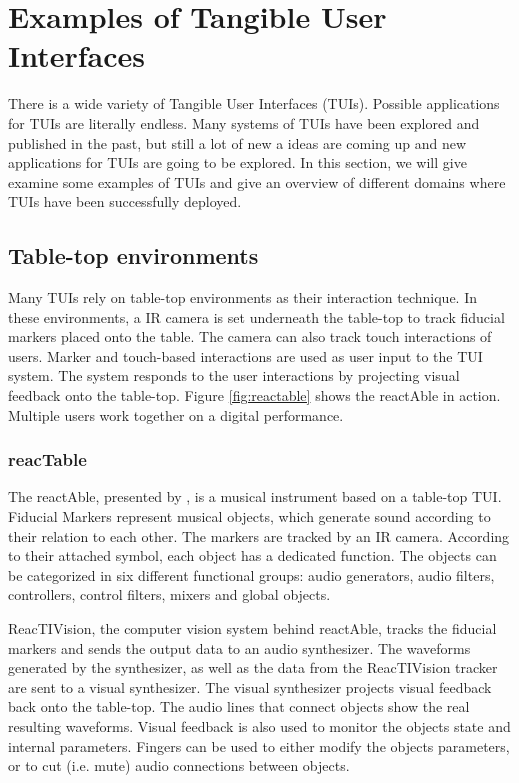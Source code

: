 \section{Examples of Tangible User Interfaces}
There is a wide variety of Tangible User Interfaces (TUIs). Possible applications for TUIs are literally endless. Many systems of TUIs have been explored and published in the past, but still a lot of new a ideas are coming up and new applications for TUIs are going to be explored. In this section, we will give examine some examples of TUIs and give an overview of different domains where TUIs have been successfully deployed.

\subsection{Table-top environments}
Many TUIs rely on table-top environments as their interaction technique. In these environments, a IR camera is set underneath the table-top to track fiducial markers placed onto the table. The camera can also track touch interactions of users. Marker and touch-based interactions are used as user input to the TUI system. The system responds to the user interactions by projecting visual feedback onto the table-top. Figure \ref{fig:reactable} shows the reactAble in action. Multiple users work together on a digital performance.

\subsubsection{reacTable}
The reactAble, presented by \cite{jorda07}, is a musical instrument based on a table-top TUI. Fiducial Markers represent musical objects, which generate sound according to their relation to each other. The markers are tracked by an IR camera. According to their attached symbol, each object has a dedicated function. The objects can be categorized in six different functional groups: audio generators, audio filters, controllers, control filters, mixers and global objects. 

ReacTIVision, the computer vision system behind reactAble, tracks the fiducial markers and sends the output data to an audio synthesizer. The waveforms generated by the synthesizer, as well as the data from the ReacTIVision tracker are sent to a visual synthesizer. The visual synthesizer projects visual feedback back onto the table-top. The audio lines that connect objects show the real resulting waveforms. Visual feedback is also used to monitor the objects state and internal parameters. Fingers can be used to either modify the objects parameters, or to cut (i.e. mute) audio connections between objects. 

